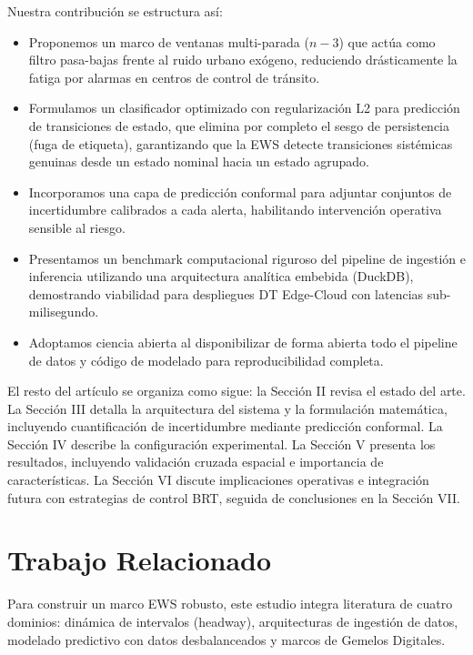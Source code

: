 \documentclass[journal,twocolumn]{IEEEtran}
\begin{document}
Nuestra contribución se estructura así:
\begin{itemize}
	\item Proponemos un marco de ventanas multi-parada ($n-3$) que actúa como filtro pasa-bajas frente al ruido urbano exógeno, reduciendo drásticamente la fatiga por alarmas en centros de control de tránsito.
	\item Formulamos un clasificador optimizado con regularización L2 para predicción de transiciones de estado, que elimina por completo el sesgo de persistencia (fuga de etiqueta), garantizando que la EWS detecte transiciones sistémicas genuinas desde un estado nominal hacia un estado agrupado.
	\item Incorporamos una capa de predicción conformal para adjuntar conjuntos de incertidumbre calibrados a cada alerta, habilitando intervención operativa sensible al riesgo.
	\item Presentamos un benchmark computacional riguroso del pipeline de ingestión e inferencia utilizando una arquitectura analítica embebida (DuckDB), demostrando viabilidad para despliegues DT Edge-Cloud con latencias sub-milisegundo.
	\item Adoptamos ciencia abierta al disponibilizar de forma abierta todo el pipeline de datos y código de modelado para reproducibilidad completa.
\end{itemize}

El resto del artículo se organiza como sigue: la Sección II revisa el estado del arte. La Sección III detalla la arquitectura del sistema y la formulación matemática, incluyendo cuantificación de incertidumbre mediante predicción conformal. La Sección IV describe la configuración experimental. La Sección V presenta los resultados, incluyendo validación cruzada espacial e importancia de características. La Sección VI discute implicaciones operativas e integración futura con estrategias de control BRT, seguida de conclusiones en la Sección VII.

\section{Trabajo Relacionado}

Para construir un marco EWS robusto, este estudio integra literatura de cuatro dominios: dinámica de intervalos (headway), arquitecturas de ingestión de datos, modelado predictivo con datos desbalanceados y marcos de Gemelos Digitales.
\end{document}
